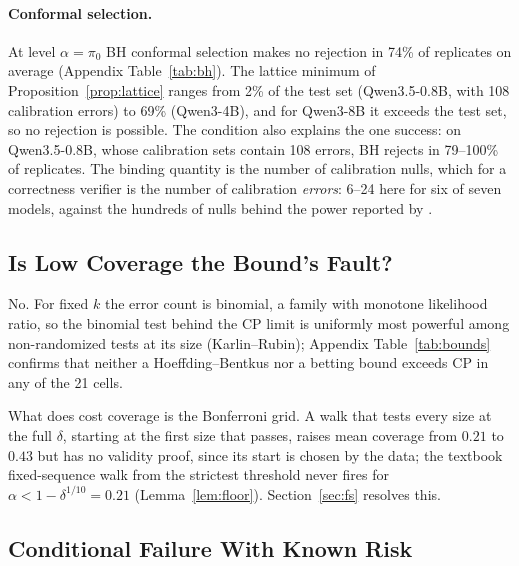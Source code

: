 \documentclass[twoside]{article}
\theoremstyle{remark}
\newcommand{\pizero}{\pi_0}
\begin{document}
\paragraph{Conformal selection.} At level $\alpha=\pizero$ BH conformal selection makes no rejection in 74\% of replicates on average (Appendix Table~\ref{tab:bh}). The lattice minimum of Proposition~\ref{prop:lattice} ranges from 2\% of the test set (Qwen3.5-0.8B, with 108 calibration errors) to 69\% (Qwen3-4B), and for Qwen3-8B it exceeds the test set, so no rejection is possible. The condition also explains the one success: on Qwen3.5-0.8B, whose calibration sets contain 108 errors, BH rejects in 79--100\% of replicates. The binding quantity is the number of calibration nulls, which for a correctness verifier is the number of calibration \emph{errors}: 6--24 here for six of seven models, against the hundreds of nulls behind the power reported by \citet{gui2024conformal}.

\subsection{Is Low Coverage the Bound's Fault?}
\label{sec:tighter}

No. For fixed $k$ the error count is binomial, a family with monotone likelihood ratio, so the binomial test behind the CP limit is uniformly most powerful among non-randomized tests at its size (Karlin--Rubin); Appendix Table~\ref{tab:bounds} confirms that neither a Hoeffding--Bentkus nor a betting bound exceeds CP in any of the 21 cells.

What does cost coverage is the Bonferroni grid. A walk that tests every size at the full $\delta$, starting at the first size that passes, raises mean coverage from $0.21$ to $0.43$ but has no validity proof, since its start is chosen by the data; the textbook fixed-sequence walk from the strictest threshold \citep{bauer1991multiple} never fires for $\alpha<1-\delta^{1/10}=0.21$ (Lemma~\ref{lem:floor}). Section~\ref{sec:fs} resolves this.

\subsection{Conditional Failure With Known Risk}
\label{sec:synthetic}
\end{document}
